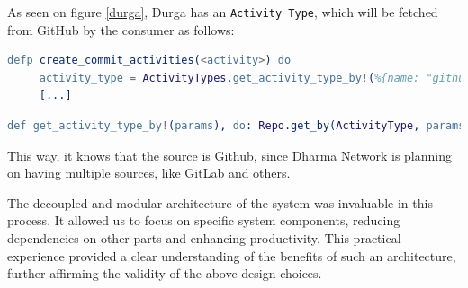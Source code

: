 As seen on figure \ref{durga}, Durga has an \texttt{Activity Type}, which will be fetched from GitHub by the consumer as follows:

\begin{lstlisting}[language=erlang, caption={Create Activity Type on activity\_consumer.ex}]
   defp create_commit_activities(<activity>) do
     activity_type = ActivityTypes.get_activity_type_by!(%{name: "github", description: "<description>"})
     [...]
\end{lstlisting}

\begin{lstlisting}[language=erlang, caption={Get Activity Type on activity\_types.ex}]
def get_activity_type_by!(params), do: Repo.get_by(ActivityType, params)
\end{lstlisting}

This way, it knows that the source is Github, since Dharma Network is planning on having multiple sources, like GitLab and others.\newline

The decoupled and modular architecture of the system was invaluable in this process. It allowed us to focus on specific system components, reducing dependencies on other parts and enhancing productivity. This practical experience provided a clear understanding of the benefits of such an architecture, further affirming the validity of the above design choices.\newline




 


